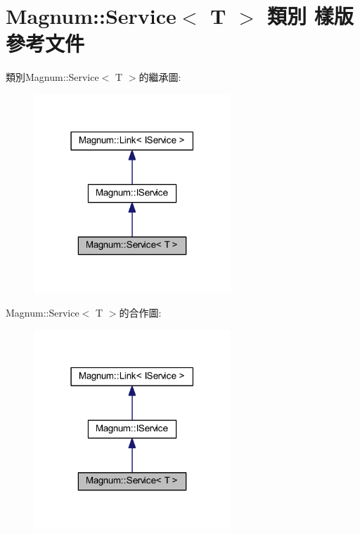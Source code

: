 \hypertarget{class_magnum_1_1_service}{}\section{Magnum\+:\+:Service$<$ T $>$ 類別 樣版 參考文件}
\label{class_magnum_1_1_service}


類別\+Magnum\+:\+:Service$<$ T $>$的繼承圖\+:\nopagebreak
\begin{figure}[H]
\begin{center}
\leavevmode
\includegraphics[width=210pt]{class_magnum_1_1_service__inherit__graph}
\end{center}
\end{figure}


Magnum\+:\+:Service$<$ T $>$的合作圖\+:\nopagebreak
\begin{figure}[H]
\begin{center}
\leavevmode
\includegraphics[width=210pt]{class_magnum_1_1_service__coll__graph}
\end{center}
\end{figure}
